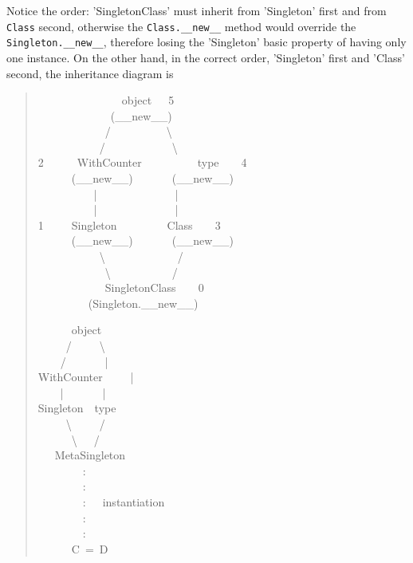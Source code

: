 \documentclass[10pt,english]{article}
\begin{document}
Notice the order: 'SingletonClass' must inherit from 'Singleton' 
first and from \texttt{Class} second, otherwise the \texttt{Class.{\_}{\_}new{\_}{\_}} method would
override the  \texttt{Singleton.{\_}{\_}new{\_}{\_}}, therefore losing the 'Singleton'
basic property of having only one instance. On the other hand, in
the correct order, 'Singleton' first and 'Class' second, the inheritance
diagram is
\begin{quote}
\begin{ttfamily}\begin{flushleft}
\mbox{~~~~~~~~~~~~~~~object~~~5}\\
\mbox{~~~~~~~~~~~~~({\_}{\_}new{\_}{\_})}\\
\mbox{~~~~~~~~~~~~/~~~~~~~~~~{\textbackslash}}\\
\mbox{~~~~~~~~~~~/~~~~~~~~~~~~{\textbackslash}}\\
\mbox{2~~~~~~WithCounter~~~~~~~~~~type~~~~4}\\
\mbox{~~~~~~({\_}{\_}new{\_}{\_})~~~~~~~({\_}{\_}new{\_}{\_})}\\
\mbox{~~~~~~~~~~|~~~~~~~~~~~~~~|}\\
\mbox{~~~~~~~~~~|~~~~~~~~~~~~~~|}\\
\mbox{1~~~~~Singleton~~~~~~~~~Class~~~~3}\\
\mbox{~~~~~~({\_}{\_}new{\_}{\_})~~~~~~~({\_}{\_}new{\_}{\_})}\\
\mbox{~~~~~~~~~~~{\textbackslash}~~~~~~~~~~~~~/}\\
\mbox{~~~~~~~~~~~~{\textbackslash}~~~~~~~~~~~/}\\
\mbox{~~~~~~~~~~~~SingletonClass~~~~0}\\
\mbox{~~~~~~~~~(Singleton.{\_}{\_}new{\_}{\_})}
\end{flushleft}\end{ttfamily}
\begin{ttfamily}\begin{flushleft}
\mbox{~~~~~~object}\\
\mbox{~~~~~/~~~~~{\textbackslash}}\\
\mbox{~~~~/~~~~~~~|}\\
\mbox{WithCounter~~~~~|~}\\
\mbox{~~~~|~~~~~~~|}\\
\mbox{Singleton~~type}\\
\mbox{~~~~~{\textbackslash}~~~~~/}\\
\mbox{~~~~~~{\textbackslash}~~~/}\\
\mbox{~~~MetaSingleton}\\
\mbox{~~~~~~~~:}\\
\mbox{~~~~~~~~:~~~~~~~}\\
\mbox{~~~~~~~~:~~~instantiation}\\
\mbox{~~~~~~~~:}\\
\mbox{~~~~~~~~:}\\
\mbox{~~~~~~C~=~D}
\end{flushleft}\end{ttfamily}
\end{quote}
\end{document}
